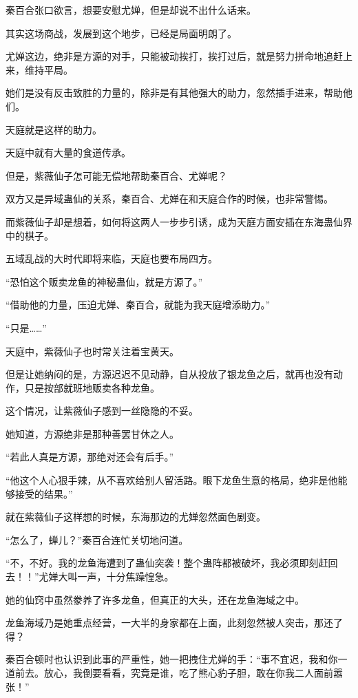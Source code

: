 \begin{this_body}
秦百合张口欲言，想要安慰尤婵，但是却说不出什么话来。

其实这场商战，发展到这个地步，已经是局面明朗了。

尤婵这边，绝非是方源的对手，只能被动挨打，挨打过后，就是努力拼命地追赶上来，维持平局。

她们是没有反击致胜的力量的，除非是有其他强大的助力，忽然插手进来，帮助他们。

天庭就是这样的助力。

天庭中就有大量的食道传承。

但是，紫薇仙子怎可能无偿地帮助秦百合、尤婵呢？

双方又是异域蛊仙的关系，秦百合、尤婵在和天庭合作的时候，也非常警惕。

而紫薇仙子却是想着，如何将这两人一步步引诱，成为天庭方面安插在东海蛊仙界中的棋子。

五域乱战的大时代即将来临，天庭也要布局四方。

“恐怕这个贩卖龙鱼的神秘蛊仙，就是方源了。”

“借助他的力量，压迫尤婵、秦百合，就能为我天庭增添助力。”

“只是……”

天庭中，紫薇仙子也时常关注着宝黄天。

但是让她纳闷的是，方源迟迟不见动静，自从投放了银龙鱼之后，就再也没有动作，只是按部就班地贩卖各种龙鱼。

这个情况，让紫薇仙子感到一丝隐隐的不妥。

她知道，方源绝非是那种善罢甘休之人。

“若此人真是方源，那绝对还会有后手。”

“他这个人心狠手辣，从不喜欢给别人留活路。眼下龙鱼生意的格局，绝非是他能够接受的结果。”

就在紫薇仙子这样想的时候，东海那边的尤婵忽然面色剧变。

“怎么了，蝉儿？”秦百合连忙关切地问道。

“不，不好。我的龙鱼海遭到了蛊仙突袭！整个蛊阵都被破坏，我必须即刻赶回去！！”尤婵大叫一声，十分焦躁惶急。

她的仙窍中虽然豢养了许多龙鱼，但真正的大头，还在龙鱼海域之中。

龙鱼海域乃是她重点经营，一大半的身家都在上面，此刻忽然被人突击，那还了得？

秦百合顿时也认识到此事的严重性，她一把拽住尤婵的手：“事不宜迟，我和你一道前去。放心，我倒要看看，究竟是谁，吃了熊心豹子胆，敢在你我二人面前嚣张！”


\end{this_body}
